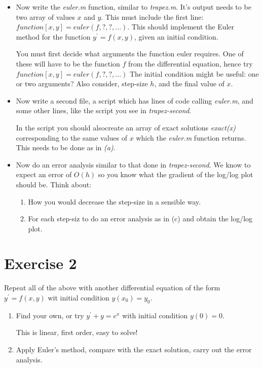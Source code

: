 \documentclass[10pt, a4paper]{article}
\begin{document}
\begin{itemize}
    \item Now write the \textit{euler.m} function, similar to \textit{trapez.m}. It’s output needs
    to be two array of values $x$ and $y$.  This must include the first line: $function[x,y] =
    euler(f,?,?,...)$. This should implement the Euler method for the function $y^\prime=f(x,y)$, given an
    initial condition.  
    
    You must first decide what arguments the function euler requires. One of these will have to be
    the function $f$ from the differential equation, hence try $function [x,y] = euler(f,?,?,...)$
    The initial condition might be useful: one or two arguments?  Also consider, step-size
    $h$, and the final value of $x$.

    \item Now write a second file, a script which has lines of code calling \textit{euler.m}, and
    some other lines, like the script you see in \textit{trapez-second}. 

    In the script you should alsocreate an array of exact solutions \textit{exact(x)} corresponding
    to the same values of $x$ which the \textit{euler.m} function returns. This needs to be done as
    in \textit{(a)}.
    
    \item Now do an error analysis similar to that done in \textit{trapez-second}. We know to expect
    an error of $O(h)$ so you know what the gradient of the log/log plot should be. Think about:
    \begin{enumerate}
        \item How you would decrease the step-size in a sensible way.
        \item For each step-siz to do an error analysis as in (c) and obtain the log/log plot.
    \end{enumerate} 
\end{itemize}

\section{Exercise 2}

Repeat all of the above with another differential equation of the form $y^\prime=f(x,y)$ wit initial
condition $y(x_0)=y_0$.  
\begin{enumerate}
    \item Find your own, or try $y^\prime + y=e^x$ with initial condition $y(0)=0$. 
    
    This is linear, first order, easy to solve!

    \item Apply Euler’s method, compare with the exact solution, carry out the error analysis.
\end{enumerate} 
    
\end{document}
